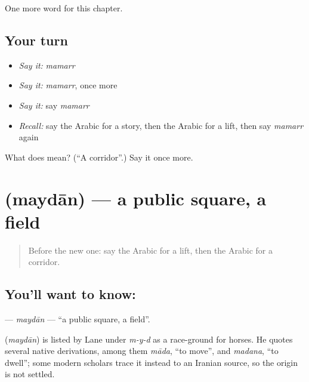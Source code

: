 \begin{grammarlens}[title={What you've built}]
One more word for this chapter.
\end{grammarlens}

\subsection*{Your turn}
\begin{itemize}
\raggedright
  \item \emph{Say it:} \emph{mamarr}
  \item \emph{Say it:} \emph{mamarr}, once more
  \item \emph{Say it:} say \emph{mamarr}
  \item \emph{Recall:} say the Arabic for a story, then the Arabic for a lift, then say \emph{mamarr} again
\end{itemize}

\begin{tcolorbox}[breakable,colback=teal!4,colframe=teal!35!black,title={Before you move on}]
What does  mean? (\textquotedblleft{}A corridor\textquotedblright{}.) Say it once more.
\end{tcolorbox}
\section[\texorpdfstring{\ar{ميدان} (maydān)}{ميدان (maydān)}]{ (maydān) — a public square, a field}

\label{lesson:AR-C100-maydan}



\begin{quote}
Before the new one: say the Arabic for a lift, then the Arabic for a corridor.
\end{quote}

\subsection*{You'll want to know: }
\textbf{} — \emph{maydān} — \textquotedblleft{}a public square, a field\textquotedblright{}.

\begin{cousinweb}
\textbf{} (\emph{maydān}) is listed by Lane under \emph{m-y-d} as a race-ground for horses. He quotes several native derivations, among them \emph{māda}, \textquotedblleft{}to move\textquotedblright{}, and \emph{madana}, \textquotedblleft{}to dwell\textquotedblright{}; some modern scholars trace it instead to an Iranian source, so the origin is not settled.
\end{cousinweb}


